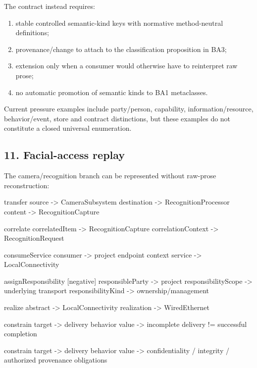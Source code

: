 \documentclass[
  10pt,
  a4paper,
]{article}
\newenvironment{Shaded}{}{}
\newcommand{\NormalTok}[1]{#1}
\providecommand{\tightlist}{%
  \setlength{\itemsep}{0pt}\setlength{\parskip}{0pt}}
\begin{document}
The contract instead requires:

\begin{enumerate}
\def\labelenumi{\arabic{enumi}.}
\tightlist
\item
  stable controlled semantic-kind keys with normative method-neutral
  definitions;
\item
  provenance/change to attach to the classification proposition in BA3;
\item
  extension only when a consumer would otherwise have to reinterpret raw
  prose;
\item
  no automatic promotion of semantic kinds to BA1 metaclasses.
\end{enumerate}

Current pressure examples include party/person, capability,
information/resource, behavior/event, store and contract distinctions,
but these examples do not constitute a closed universal enumeration.

\subsection{11. Facial-access replay}\label{11-facial-access-replay}

The camera/recognition branch can be represented without raw-prose
reconstruction:

\begin{Shaded}
\begin{Highlighting}[]
\NormalTok{transfer}
\NormalTok{  source      {-}\textgreater{} CameraSubsystem}
\NormalTok{  destination {-}\textgreater{} RecognitionProcessor}
\NormalTok{  content     {-}\textgreater{} RecognitionCapture}

\NormalTok{correlate}
\NormalTok{  correlatedItem     {-}\textgreater{} RecognitionCapture}
\NormalTok{  correlationContext {-}\textgreater{} RecognitionRequest}

\NormalTok{consumeService}
\NormalTok{  consumer {-}\textgreater{} project endpoint context}
\NormalTok{  service  {-}\textgreater{} LocalConnectivity}

\NormalTok{assignResponsibility [negative]}
\NormalTok{  responsibleParty    {-}\textgreater{} project}
\NormalTok{  responsibilityScope {-}\textgreater{} underlying transport}
\NormalTok{  responsibilityKind  {-}\textgreater{} ownership/management}

\NormalTok{realize}
\NormalTok{  abstract    {-}\textgreater{} LocalConnectivity}
\NormalTok{  realization {-}\textgreater{} WiredEthernet}

\NormalTok{constrain}
\NormalTok{  target {-}\textgreater{} delivery behavior}
\NormalTok{  value  {-}\textgreater{} incomplete delivery != successful completion}

\NormalTok{constrain}
\NormalTok{  target {-}\textgreater{} delivery behavior}
\NormalTok{  value  {-}\textgreater{} confidentiality / integrity / authorized provenance obligations}
\end{Highlighting}
\end{Shaded}
\end{document}
